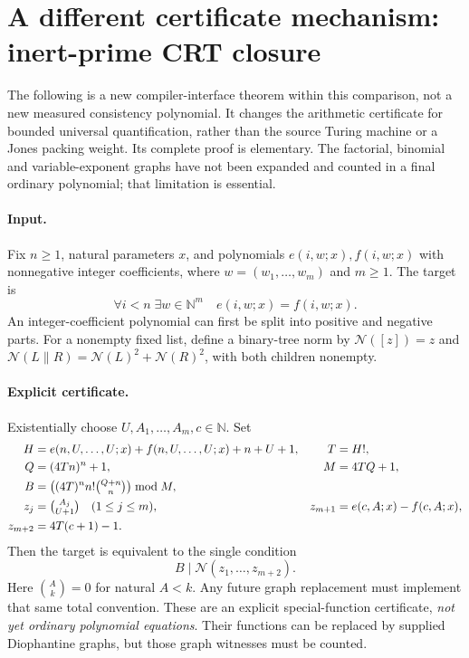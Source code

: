 \section{A different certificate mechanism: inert-prime CRT closure}
\label{sec:inert-crt}
The following is a new compiler-interface theorem within this comparison,
not a new measured consistency polynomial. It changes the arithmetic
certificate for bounded universal quantification, rather than the source
Turing machine or a Jones packing weight. Its complete proof is elementary.
The factorial, binomial and variable-exponent graphs have not been expanded
and counted in a final ordinary polynomial; that limitation is essential.

\paragraph{Input.}
Fix $n\geq1$, natural parameters $x$, and polynomials
$e(i,w;x),f(i,w;x)$ with nonnegative integer coefficients, where
$w=(w_1,\ldots,w_m)$ and $m\geq1$. The target is
\[
 \forall i<n\;\exists w\in\mathbb N^m\quad e(i,w;x)=f(i,w;x).
\]
An integer-coefficient polynomial can first be split into positive and
negative parts. For a nonempty fixed list, define a binary-tree norm by
$\mathcal N([z])=z$ and
$\mathcal N(L\mathbin{\|}R)=\mathcal N(L)^2+\mathcal N(R)^2$, with both
children nonempty.

\paragraph{Explicit certificate.}
Existentially choose $U,A_1,\ldots,A_m,c\in\mathbb N$. Set
\begin{align*}
H&=e(n,U,\ldots,U;x)+f(n,U,\ldots,U;x)+n+U+1, & T&=H!,\\
Q&=(4Tn)^n+1, & M&=4TQ+1,\\
B&=\bigl((4T)^n n!\tbinom{Q+n}{n}\bigr)\bmod M,\\
z_j&=\tbinom{A_j}{U+1}\quad(1\leq j\leq m),&
z_{m+1}&=e(c,A;x)-f(c,A;x),\\
z_{m+2}&=4T(c+1)-1.
\end{align*}
Then the target is equivalent to the single condition
\[
 B\mid\mathcal N(z_1,\ldots,z_{m+2}).
\]
Here $\binom{A}{k}=0$ for natural $A<k$. Any future graph replacement
must implement that same total convention.
These are an explicit special-function certificate, \emph{not yet ordinary
polynomial equations}. Their functions can be replaced by supplied
Diophantine graphs, but those graph witnesses must be counted.

